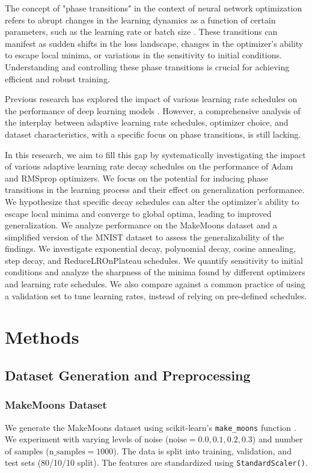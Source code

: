 \documentclass[conference]{IEEEtran}
\begin{document}
The concept of "phase transitions" in the context of neural network optimization refers to abrupt changes in the learning dynamics as a function of certain parameters, such as the learning rate or batch size \cite{zhang2017understanding, bae2017understanding}. These transitions can manifest as sudden shifts in the loss landscape, changes in the optimizer's ability to escape local minima, or variations in the sensitivity to initial conditions. Understanding and controlling these phase transitions is crucial for achieving efficient and robust training.

Previous research has explored the impact of various learning rate schedules on the performance of deep learning models \cite{loshchilov2016sgdr, smith2017cyclical, vaswani2017attention}. However, a comprehensive analysis of the interplay between adaptive learning rate schedules, optimizer choice, and dataset characteristics, with a specific focus on phase transitions, is still lacking.

In this research, we aim to fill this gap by systematically investigating the impact of various adaptive learning rate decay schedules on the performance of Adam and RMSprop optimizers. We focus on the potential for inducing phase transitions in the learning process and their effect on generalization performance. We hypothesize that specific decay schedules can alter the optimizer's ability to escape local minima and converge to global optima, leading to improved generalization. We analyze performance on the MakeMoons dataset and a simplified version of the MNIST dataset to assess the generalizability of the findings. We investigate exponential decay, polynomial decay, cosine annealing, step decay, and ReduceLROnPlateau schedules. We quantify sensitivity to initial conditions and analyze the sharpness of the minima found by different optimizers and learning rate schedules.  We also compare against a common practice of using a validation set to tune learning rates, instead of relying on pre-defined schedules.

\section{Methods}

\subsection{Dataset Generation and Preprocessing}

\subsubsection{MakeMoons Dataset}
We generate the MakeMoons dataset using scikit-learn's \texttt{make\_moons} function \cite{scikit-learn}. We experiment with varying levels of noise ($\text{noise} = 0.0, 0.1, 0.2, 0.3$) and number of samples ($\text{n\_samples} = 1000$).  The data is split into training, validation, and test sets (80/10/10 split). The features are standardized using \texttt{StandardScaler()}.
\end{document}
